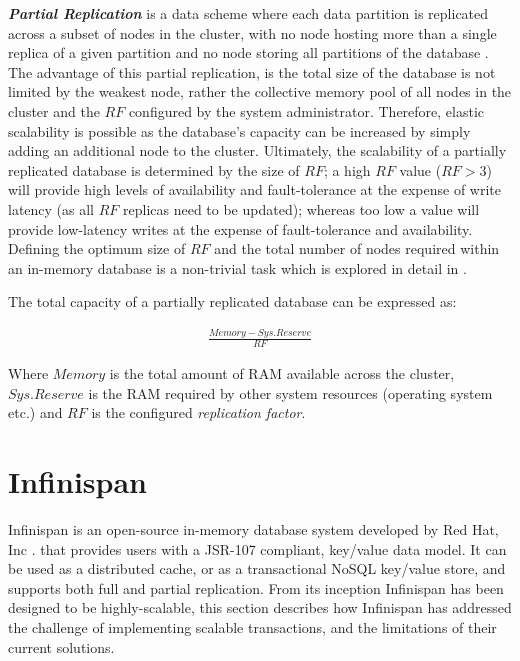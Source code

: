 	\textbf{\emph{Partial Replication}} is a data scheme where each data partition is replicated across a subset of nodes in the cluster, with no node hosting more than a single replica of a given partition and no node storing all partitions of the database \citep{Schiper:2010:PGP:1915085.1916444}.  The advantage of this partial replication, is the total size of the database is not limited by the weakest node, rather the collective memory pool of all nodes in the cluster and the $RF$ configured by the system administrator.  Therefore, elastic scalability is possible as the database's capacity can be increased by simply adding an additional node to the cluster.  Ultimately, the scalability of a partially replicated database is determined by the size of $RF$; a high $RF$ value ($RF > 3$) will provide high levels of availability and fault-tolerance at the expense of write latency (as all $RF$ replicas need to be updated); whereas too low a value will provide low-latency writes at the expense of fault-tolerance and availability.   Defining the optimum size of $RF$ and the total number of nodes required within an in-memory database is a non-trivial task which is explored in detail in \citep{DiSanzo:2013:FHP:2512734.2512743}.  
	
	The total capacity of a partially replicated database can be expressed as:
	
	\begin{equation*}
		     \begin{aligned}
		       \frac{Memory - Sys.Reserve}{RF}
		     \end{aligned}
	\end{equation*}	
	
	 Where $Memory$ is the total amount of RAM available across the cluster, $Sys.Reserve$ is the RAM required by other system resources (operating system etc.) and $RF$ is the configured \emph{replication factor}.  


\section{Infinispan}\label{sec:infinispan}
Infinispan \citep{Infinispan, marchioni2012infinispan} is an open-source in-memory database system developed by Red Hat, Inc \citep{RedHat}. that provides users with a JSR-107 \citep{JSR-107} compliant, key/value data model.  It can be used as a distributed cache, or as a transactional NoSQL key/value store, and supports both full and partial replication.  From its inception Infinispan has been designed  to be highly-scalable, this section describes how Infinispan has addressed the challenge of implementing scalable transactions, and the limitations of their current solutions.  

